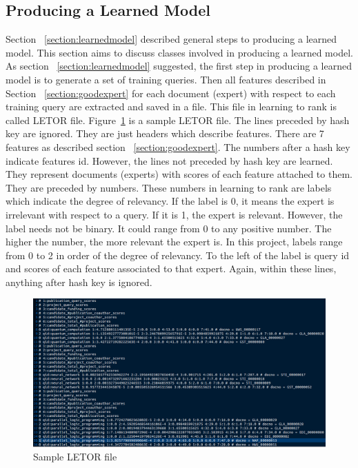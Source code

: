 \subsection{Producing a Learned Model}\label{section:producelearnedmodel}
Section ~\ref{section:learnedmodel} described general steps to producing a learned model. This section aims to discuss classes involved in producing a learned model.
As section ~\ref{section:learnedmodel} suggested, the first step in producing a learned model is to generate a set of training queries. 
Then all features described in Section ~\ref{section:goodexpert} for each document (expert) with respect to each training query are extracted and saved
in a file. This file in learning to rank is called LETOR file. Figure~\ref{fig:sampleletorfile} is a sample LETOR file. The lines preceded by hash key are 
ignored. They are just headers which describe features. There are 7 features as described section ~\ref{section:goodexpert}.
The numbers after a hash key indicate features id. However, the lines not preceded by hash key are learned. They represent documents (experts) with scores
of each feature attached to them. They are preceded by numbers. These numbers in learning to rank are labels which indicate the degree of relevancy.
If the label is 0, it means the expert is irrelevant with respect to a query. If it is 1, the expert is relevant. However, the label needs not be binary.
It could range from 0 to any positive number. The higher the number, the more relevant the expert is. In this project, labels range from 0 to 2 in order of 
the degree of relevancy. To the left of the label is query id and scores of each feature associated to that expert. Again, within these lines, anything after hash key is ignored.
\begin{figure}
\centering
\includegraphics[scale=0.3]{./figures/sampleletorfile.png}
\caption{Sample LETOR file} \label{fig:sampleletorfile} 
\end{figure}


